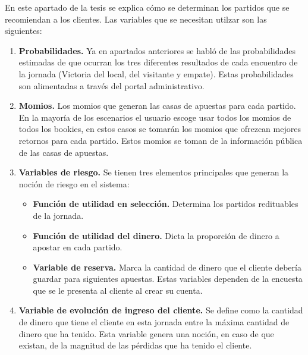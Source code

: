 En este apartado de la tesis se explica cómo se determinan los partidos que se recomiendan a los clientes.
Las variables que se necesitan utilzar son las siguientes:
\begin{enumerate}
	\item \textbf{Probabilidades.} Ya en apartados anteriores se habló de las probabilidades estimadas de que ocurran los tres diferentes resultados de cada encuentro de la jornada (Victoria del local, del visitante y empate). Estas probabilidades son alimentadas a través del portal administrativo.
	
	\item \textbf{Momios.} Los momios que generan las casas de apuestas para cada partido. En la mayoría de los escenarios el usuario escoge usar todos los momios de todos los bookies, en estos casos se tomarán los momios que ofrezcan mejores retornos para cada partido. Estos momios se toman de la información pública de las casas de apuestas.
	
	\item \textbf{Variables de riesgo.} Se tienen tres elementos principales que generan la noción de riesgo en el sistema:
	\begin{itemize}
		\item \textbf{Función de utilidad en selección.} Determina los partidos redituables de la jornada.
		\item \textbf{Función de utilidad del dinero.} Dicta la proporción de dinero a apostar en cada partido.
		\item \textbf{Variable de reserva.} Marca la cantidad de dinero que el cliente debería guardar para siguientes apuestas.
		Estas variables dependen de la encuesta que se le presenta al cliente al crear su cuenta.
	\end{itemize}
	
	\item \textbf{Variable de evolución de ingreso del cliente.} Se define como la cantidad de dinero que tiene el cliente en esta jornada entre la máxima cantidad de dinero que ha tenido. Esta variable genera una noción, en caso de que existan, de la magnitud de las pérdidas que ha tenido el cliente.
\end{enumerate}

